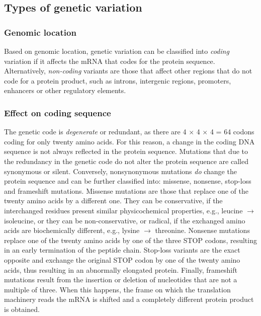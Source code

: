 \subsection{Types of genetic variation}

\subsubsection{Genomic location}

Based on genomic location, genetic variation can be classified into \textit{coding} variation if it affects the mRNA that codes for the protein sequence. Alternatively, \textit{non-coding} variants are those that affect other regions that do not code for a protein product, such as introns, intergenic regions, promoters, enhancers or other regulatory elements.

\subsubsection{Effect on coding sequence}

The genetic code is \textit{degenerate} or redundant, as there are 4 $\times$ 4 $\times$ 4 = 64 codons coding for only twenty amino acids. For this reason, a change in the coding DNA sequence is not always reflected in the protein sequence. Mutations that due to the redundancy in the genetic code do not alter the protein sequence are called synonymous or silent. Conversely, nonsynonymous mutations \textit{do} change the protein sequence and can be further classified into: missense, nonsense, stop-loss and frameshift mutations. Missense mutations are those that replace one of the twenty amino acids by a different one. They can be conservative, if the interchanged residues present similar physicochemical properties, e.g., leucine $\rightarrow$ isoleucine, or they can be non-conservative, or radical, if the exchanged amino acids are biochemically different, e.g., lysine $\rightarrow$ threonine. Nonsense mutations replace one of the twenty amino acids by one of the three STOP codons, resulting in an early termination of the peptide chain. Stop-loss variants are the exact opposite and exchange the original STOP codon by one of the twenty amino acids, thus resulting in an abnormally elongated protein. Finally, frameshift mutations result from the insertion or deletion of nucleotides that are not a multiple of three. When this happens, the frame on which the translation machinery reads the mRNA is shifted and a completely different protein product is obtained.

